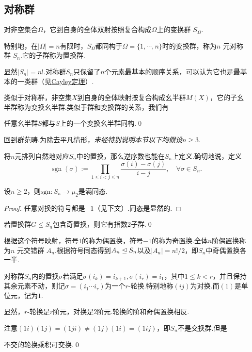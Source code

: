 \subsection{对称群}
对非空集合$\Omega$，它到自身的全体双射按照复合构成$\Omega$上的{\heiti 变换群} $S_\Omega$.

特别地，在$|\Omega|=n$有限时，$S_\Omega$都同构于$\Omega=\{1,\cdots,n\}$时的变换群，称为$n$ {\heiti 元对称群} $S_n$.它的子群称为{\heiti 置换群}.

显然$|S_n|=n!$.对称群$S_n$只保留了$n$个元素最基本的顺序关系，可以认为它也是最基本的一类群（见\hyperlink{thm:Cayley}{Cayley定理}）.

类似于对称群，非空集$X$到自身的全体映射按复合构成幺半群$M(X)$，它的子幺半群称为{\heiti 变换幺半群}.类似于群和变换群的关系，我们有
\begin{lemma}
	任意幺半群$S$都与$S$上的一个变换幺半群同构.\qed
\end{lemma}

回到群范畴.为除去平凡情形，\emph{未经特别说明本节以下均假设$n\ge 3$}.

将$n$元排列自然地对应$S_n$中的置换，那么逆序数也能在$S_n$上定义.确切地说，定义
\[
	\operatorname*{sgn}(\sigma):=\prod_{1\le i<j\le n}\frac{\sigma(i)-\sigma(j)}{i-j},\quad\forall\sigma\in S_n.
\]
\vspace*{-8pt}
\begin{lemma}
	设$n\ge 2$，则$\mathrm{sgn}\colon S_n\to\mu_2$是满同态.
\end{lemma}
\begin{proof}
	任意对换的符号都是$-1$（见下文）.同态是显然的.
\end{proof}
\begin{cor*}
	若置换群$G\le S_n$包含奇置换，则它有指数$2$子群.\qed\hypertarget{cor:Index2Permutation}{}
\end{cor*}

根据这个符号映射，符号$1$的称为{\heiti 偶置换}，符号$-1$的称为{\heiti 奇置换}.全体$n$阶偶置换称为$n$ {\heiti 元交错群} $A_n$.根据符号同态得到$A_n\trianglelefteq S_n$以及$|A_n|=n!/2$，即$S_n$中奇偶置换各一半.

对称群$S_n$内的置换$\sigma$若满足$\sigma(i_k)=i_{k+1},\sigma(i_r)=i_1$，其中$1\le k<r$，并且保持其余元素不动，则记$\sigma=(i_1\cdots i_r)$为一个$r${\heiti -轮换}.特别地称$(ij)$为{\heiti 对换}.而$(1)$是单位元，记为$1$.

显然，$r$-轮换是$r$阶元，对换是$2$阶元.轮换的阶和奇偶置换相反.

注意$(1i)(1j)=(1ji)\ne(1j)(1i)=(1ij)$，即$S_n$不是交换群.但是
\begin{lemma*}
	不交的轮换乘积可交换.\qed
\end{lemma*}

